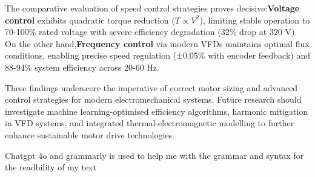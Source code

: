 \documentclass[a4paper,11pt]{IEEEtran}
\begin{document}
The comparative evaluation of speed control strategies proves decisive:\textbf{Voltage control} exhibits quadratic torque reduction ($T \propto V^2$), limiting stable operation to 70-100\% rated voltage with severe efficiency degradation (32\% drop at 320 V). On the other hand,\textbf{Frequency control} via modern VFDs maintains optimal flux conditions, enabling precise speed regulation (±0.05\% with encoder feedback) and 88-94\% system efficiency across 20-60 Hz.
 
These findings underscore the imperative of correct motor sizing and advanced control strategies for modern electromechanical systems. Future research should investigate machine learning-optimised efficiency algorithms, harmonic mitigation in VFD systems, and integrated thermal-electromagnetic modelling to further enhance sustainable motor drive technologies.

 




\appendix
Chatgpt 4o and grammarly is used to help me with the grammar and syntax for the readbility of my text

 
\end{document}
